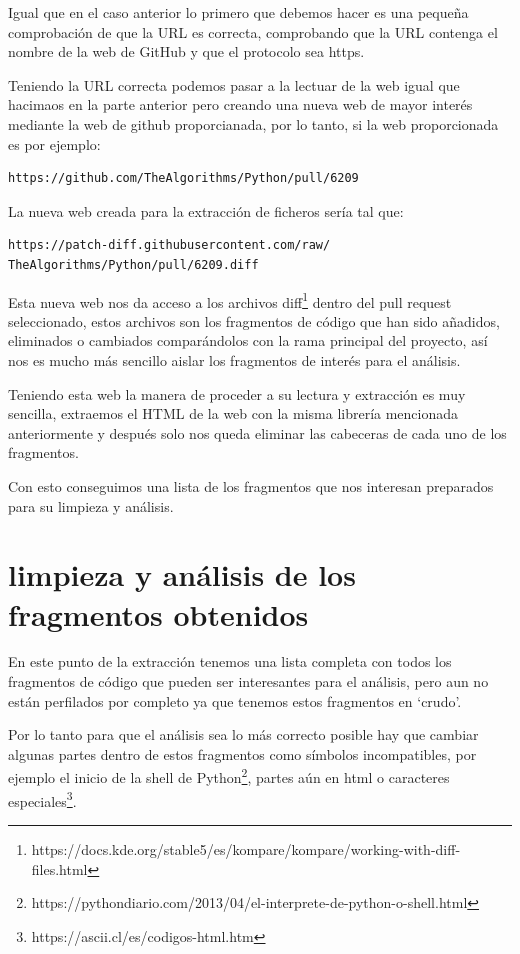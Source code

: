 \documentclass[a4paper, 12pt]{book}
\begin{document}
Igual que en el caso anterior lo primero que debemos hacer es una pequeña comprobación de que la URL es correcta, comprobando que la URL contenga el nombre de la web de GitHub y que el protocolo sea https.

Teniendo la URL correcta podemos pasar a la lectuar de la web igual que hacimaos en la parte anterior pero creando una nueva web de mayor interés mediante la web de github proporcianada, por lo tanto, si la web proporcionada es por ejemplo:
\begin{verbatim}
https://github.com/TheAlgorithms/Python/pull/6209
\end{verbatim}

La nueva web creada para la extracción de ficheros sería tal que:

\begin{verbatim}
https://patch-diff.githubusercontent.com/raw/
TheAlgorithms/Python/pull/6209.diff
\end{verbatim} 

Esta nueva web nos da acceso a los archivos diff\footnote{https://docs.kde.org/stable5/es/kompare/kompare/working-with-diff-files.html} dentro del pull request seleccionado, estos archivos son los fragmentos de código que han sido añadidos, eliminados o cambiados comparándolos con la rama principal del proyecto, así nos es mucho más sencillo aislar los fragmentos de interés para el análisis.

Teniendo esta web la manera de proceder a su lectura y extracción es muy sencilla, extraemos el HTML de la web con la misma librería mencionada anteriormente y después solo nos queda eliminar las cabeceras de cada uno de los fragmentos.

Con esto conseguimos una lista de los fragmentos que nos interesan preparados para su limpieza y análisis.

\section{limpieza y análisis de los fragmentos obtenidos} 
\label{sec:limpieza y análisis de los fragmentos obtenidos}

En este punto de la extracción tenemos una lista completa con todos los fragmentos de código que pueden ser interesantes para el análisis, pero aun no están perfilados por completo ya que tenemos estos fragmentos en `crudo'.

Por lo tanto para que el análisis sea lo más correcto posible hay que cambiar algunas partes dentro de estos fragmentos como símbolos incompatibles, por ejemplo el inicio de la shell de Python\footnote{https://pythondiario.com/2013/04/el-interprete-de-python-o-shell.html}, partes aún en html o caracteres especiales\footnote{https://ascii.cl/es/codigos-html.htm}.
\end{document}
